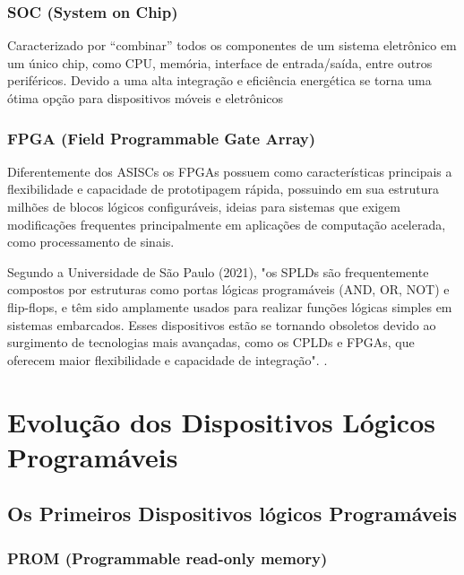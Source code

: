 \subsubsection{\esp SOC (System on Chip)}

Caracterizado por “combinar” todos os componentes de um sistema eletrônico em um único chip, como CPU, memória, interface de entrada/saída, entre outros periféricos. Devido a uma alta integração e eficiência energética se torna uma ótima opção para dispositivos móveis e eletrônicos  

\subsubsection{\esp FPGA  (Field Programmable Gate Array)}

Diferentemente dos ASISCs os FPGAs possuem como características principais a flexibilidade e capacidade de prototipagem rápida, possuindo em sua estrutura milhões de blocos lógicos configuráveis, ideias para sistemas que exigem modificações frequentes principalmente em aplicações de computação acelerada, como processamento de sinais. \cite{Rao2023}

\begin{citacaodireta}
Segundo a Universidade de São Paulo (2021), "os SPLDs são frequentemente compostos por estruturas como portas lógicas programáveis (AND, OR, NOT) e flip-flops, e têm sido amplamente usados para realizar funções lógicas simples em sistemas embarcados. Esses dispositivos estão se tornando obsoletos devido ao surgimento de tecnologias mais avançadas, como os CPLDs e FPGAs, que oferecem maior flexibilidade e capacidade de integração".
\cite[25]{Rao2023}.
\end{citacaodireta}

\section{\esp Evolução dos Dispositivos Lógicos Programáveis}

\subsection{\esp Os Primeiros Dispositivos lógicos Programáveis}

\subsubsection{\esp PROM (Programmable read-only memory)}

